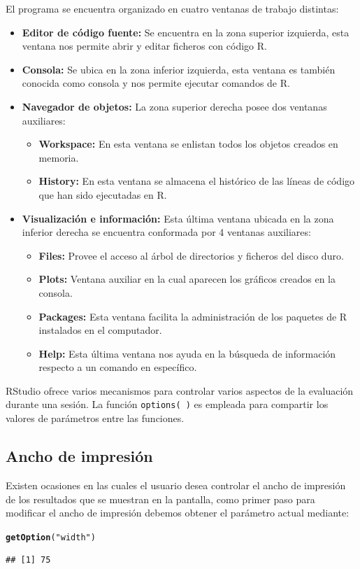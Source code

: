 \documentclass[11pt,a4paper,oneside]{book}\usepackage[]{graphicx}\usepackage[]{color}
\makeatletter
\newcommand{\hlstr}[1]{\textcolor[rgb]{0.192,0.494,0.8}{#1}}%
\newcommand{\hlstd}[1]{\textcolor[rgb]{0.345,0.345,0.345}{#1}}%
\newcommand{\hlkwd}[1]{\textcolor[rgb]{0.737,0.353,0.396}{\textbf{#1}}}%
\newenvironment{kframe}{%
 \def\at@end@of@kframe{}%
 \ifinner\ifhmode%
  \def\at@end@of@kframe{\end{minipage}}%
  \begin{minipage}{\columnwidth}%
 \fi\fi%
 \def\FrameCommand##1{\hskip\@totalleftmargin \hskip-\fboxsep
 \colorbox{shadecolor}{##1}\hskip-\fboxsep
     \hskip-\linewidth \hskip-\@totalleftmargin \hskip\columnwidth}%
 \MakeFramed {\advance\hsize-\width
   \@totalleftmargin\z@ \linewidth\hsize
   \@setminipage}}%
 {\par\unskip\endMakeFramed%
 \at@end@of@kframe}
\newenvironment{knitrout}{}{} %
\makeatother
\begin{document}
\begin{itemize}
El programa se encuentra organizado en cuatro ventanas de trabajo distintas:
\begin{itemize}
  \item {\bf Editor de código fuente:} Se encuentra en la zona superior izquierda, esta ventana nos permite abrir  y editar ficheros con código R.
  \item {\bf Consola:} Se ubica en la zona inferior izquierda, esta ventana es también conocida como consola y nos permite ejecutar comandos de R.
  \item {\bf Navegador de objetos:} La zona superior derecha posee dos ventanas auxiliares:
  \begin{itemize}
    \item {\bf Workspace:} En esta ventana se enlistan todos los objetos creados en memoria.
    \item {\bf History:} En esta ventana se almacena el histórico de las líneas de código que han sido ejecutadas en R. 
  \end{itemize}
  \item {\bf Visualización e información:} Esta última ventana ubicada en la zona inferior derecha se encuentra conformada por 4 ventanas auxiliares:
  \begin{itemize}
    \item {\bf Files:} Provee el acceso al árbol de directorios y ficheros del disco duro.
    \item {\bf Plots:} Ventana auxiliar en la cual aparecen los gráficos creados en la consola.
    \item {\bf Packages:} Esta ventana  facilita la administración de los paquetes de R instalados en el computador.
    \item {\bf Help:} Esta última ventana nos ayuda en la búsqueda de información respecto a un comando en específico.
  \end{itemize}
\end{itemize}

RStudio ofrece varios mecanismos para controlar varios aspectos de la evaluación durante una sesión. La función \texttt{options( )} es empleada para compartir los valores de parámetros entre las funciones.

\subsection{Ancho de impresión}
Existen ocasiones en las cuales el usuario desea controlar el ancho de impresión de los resultados que se muestran en la pantalla, como primer paso para modificar el ancho de impresión debemos obtener el parámetro actual mediante:
\begin{knitrout}
\color{fgcolor}\begin{kframe}
\begin{alltt}
\hlkwd{getOption}\hlstd{(}\hlstr{"width"}\hlstd{)}
\end{alltt}
\begin{verbatim}
## [1] 75
\end{verbatim}
\end{kframe}
\end{knitrout}


\end{itemize}
\end{document}
